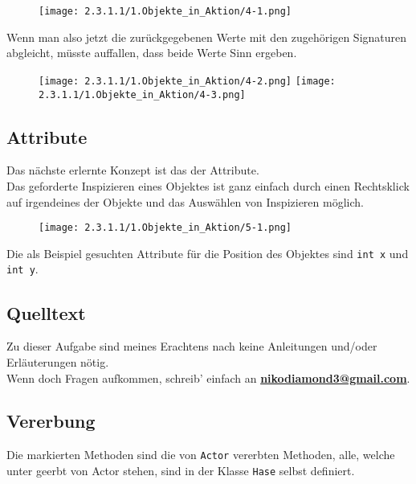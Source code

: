 \documentclass[]{scrartcl}   %
\begin{document}
\begin{figure}[ht]
	\centering
	\texttt{[image: 2.3.1.1/1.Objekte\_in\_Aktion/4-1.png]}
\end{figure}

Wenn man also jetzt die zurückgegebenen Werte mit den zugehörigen Signaturen abgleicht, müsste auffallen, dass beide Werte Sinn ergeben.

\newpage

\begin{figure}[ht]
	\centering
	\texttt{[image: 2.3.1.1/1.Objekte\_in\_Aktion/4-2.png]}
	\hspace{0.5cm}
	\texttt{[image: 2.3.1.1/1.Objekte\_in\_Aktion/4-3.png]}
\end{figure}

\subsection{Attribute}
Das nächste erlernte Konzept ist das der Attribute.\\
Das geforderte Inspizieren eines Objektes ist ganz einfach durch einen Rechtsklick auf irgendeines der Objekte und das Auswählen von \glqq Inspizieren\grqq{} möglich.

\begin{figure}[ht]
	\centering
	\texttt{[image: 2.3.1.1/1.Objekte\_in\_Aktion/5-1.png]}
\end{figure}

Die als Beispiel gesuchten Attribute für die Position des Objektes sind \texttt{int x} und \texttt{int y}.

\newpage

\subsection{Quelltext}
Zu dieser Aufgabe sind meines Erachtens nach keine Anleitungen und/oder Erläuterungen nötig.\\
Wenn doch Fragen aufkommen, schreib' einfach an \textbf{\href{mailto:nikodiamond3@gmail.com}{nikodiamond3@gmail.com}}.

\subsection{Vererbung}

Die markierten Methoden sind die von \texttt{Actor} vererbten Methoden, alle, welche unter \glqq geerbt von Actor\grqq{} stehen, sind in der Klasse \texttt{Hase} selbst definiert.\\
\end{document}
